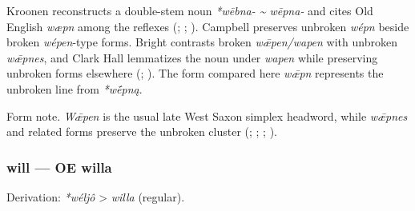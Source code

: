 \documentclass[
  british,
  a4paper,
]{article}
\begin{document}
Kroonen reconstructs a double-stem noun \emph{*wēbna- \textasciitilde{}
wēpna-} and cites Old English \emph{wæpn} among the reflexes
(;
;
). Campbell preserves unbroken
\emph{wépn} beside broken \emph{wépen}-type forms. Bright contrasts
broken \emph{wǣpen/wapen} with unbroken \emph{wǣpnes}, and Clark Hall
lemmatizes the noun under \emph{wapen} while preserving unbroken forms
elsewhere (;
). The form compared
here \emph{wǣpn} represents the unbroken line from \emph{*wḗpną}.

Form note. \emph{Wǣpen} is the usual late West Saxon simplex headword,
while \emph{wǣpnes} and related forms preserve the unbroken cluster
(;
;
;
).

\subsubsection{will --- OE willa}\label{will-oe-willa}

Derivation: \emph{*wéljô} \textgreater{} \emph{willa} (regular).

\begingroup
\setlength{\fboxsep}{6pt}
\end{document}
